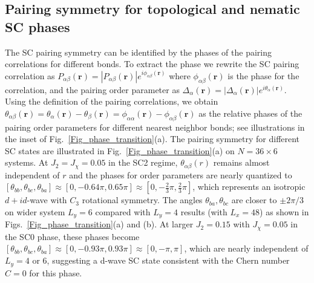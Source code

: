 \documentclass[aps,prx,reprint,superscriptaddress,showpacs]{revtex4-2}
\begin{document}
\subsection{Pairing symmetry for topological and nematic SC phases}
\label{pairing_symmetry}
The SC pairing symmetry can be identified by the phases of the pairing correlations for different bonds.
To extract the phase we rewrite the SC pairing correlation as $P_{\alpha \beta }(\mathbf{r})=\left | P_{\alpha \beta }(\mathbf{r}) \right |e^{i\phi _{\alpha \beta }(\mathbf{r})}$ where $\phi _{\alpha \beta }(\mathbf{r})$ is the phase for the correlation, and  the pairing order parameter as $\Delta_{\alpha}(\mathbf{r})=\left | \Delta_{\alpha}(\mathbf{r}) \right |e^{i\theta _{\alpha}(\mathbf{r})}$.  Using the definition of the pairing correlations, we obtain $\theta_{\alpha\beta}(\mathbf{r})=\theta_{\alpha}(\mathbf{r})-\theta_{\beta}(\mathbf{r})=\phi_{\alpha\alpha}(\mathbf{r})-\phi_{\alpha\beta}(\mathbf{r})$
as the relative phases of the pairing order parameters  for different nearest neighbor bonds; see illustrations in the inset of Fig.~\ref{Fig_phase_transition}(a). The  pairing symmetry for  different SC states are illustrated in Fig.~\ref{Fig_phase_transition}(a) on $N=36\times6$ systems. At $J_{2}=J_{\chi}=0.05$ in the SC2 regime,  $\theta _{\alpha \beta }(r)$ remains almost independent of $r$ and the phases for order parameters are nearly quantized to $[{\theta }_{bb },{\theta }_{bc},{\theta }_{ba}]\approx [0,-0.64\pi, 0.65\pi] \approx [0,-\frac{2}{3}\pi,\frac{2}{3}\pi]$, which represents an isotropic $d+id$-wave  with $C_3$ rotational symmetry. The angles ${\theta }_{ba},{\theta }_{bc}$ are closer to $\pm 2\pi/3$ on wider system $L_{y}=6$  compared with $L_{y}=4$ results (with $L_{x}=48$) as shown in  Figs.~\ref{Fig_phase_transition}(a) and (b). At larger $J_{2}=0.15$ with $J_{\chi}=0.05$ in the SC0 phase, these phases become $[{\theta }_{bb },{\theta }_{bc },{\theta }_{ba }]\approx [0,-0.93\pi, 0.93\pi]\approx [0,-\pi, \pi]$, which are nearly independent of  $L_{y}=4$ or $6$, suggesting  a d-wave SC state consistent with the Chern number $C=0$ for this phase. 
\end{document}
